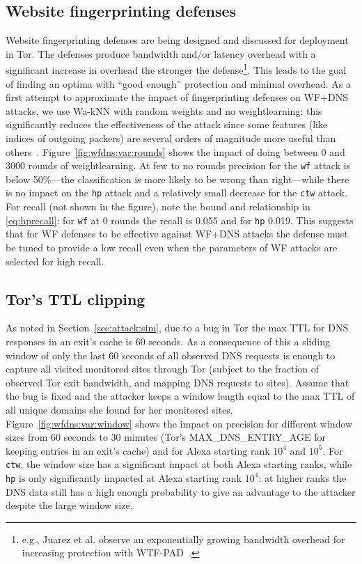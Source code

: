 \subsection{Website fingerprinting defenses}
Website fingerprinting defenses are being
designed and discussed for deployment in Tor.
The defenses produce bandwidth and/or latency overhead with a significant
increase in overhead the stronger the defense\footnote{e.g., Juarez et al.
observe an exponentially growing bandwidth overhead for increasing protection
with WTF-PAD~\cite{DBLP:journals/corr/JuarezIPDW15}.}.
This leads to the goal of finding an optima with ``good enough''
protection and minimal overhead.
As a first attempt to approximate the impact of fingerprinting
defenses on WF+DNS attacks, we use Wa-kNN with
random weights and no weightlearning: this significantly reduces the
effectiveness of the attack since some features (like indices of outgoing
packers) are several orders of magnitude more useful
than others~\cite{DBLP:journals/corr/JuarezIPDW15}.
Figure~\ref{fig:wfdns:var:rounds} shows the impact of doing between 0 and 3000
rounds of weightlearning. At few to no rounds precision for the \texttt{wf}
attack is below 50\%---the classification is more likely to be wrong than
right---while there is no impact on the \texttt{hp} attack and a relatively
small decrease for the \texttt{ctw} attack.
For recall (not shown in the figure), note the bound and relationship in
\ref{eq:hprecall}: for \texttt{wf} at 0 rounds the recall is 0.055 and for
\texttt{hp} 0.019. This suggests that for WF defenses to
be effective against WF+DNS attacks the defense must be tuned to provide a
low recall even when the parameters of WF attacks are selected for high
recall.

\subsection{Tor's TTL clipping}
As noted in Section~\ref{sec:attack:sim}, due to a bug in Tor the max TTL
for DNS responses in an exit's cache is 60 seconds. As a consequence of this
a sliding window of only the last 60 seconds of all observed DNS requests is
enough to capture all visited monitored sites through Tor (subject to the
fraction of observed Tor exit bandwidth, and mapping DNS requests to sites).
Assume that the bug is fixed and the attacker keeps a window length equal
to the max TTL of all unique domains she found for her monitored sites.
Figure~\ref{fig:wfdns:var:window} shows the impact on precision for different
window sizes from 60 seconds to 30 minutes (Tor's MAX\_DNS\_ENTRY\_AGE
for keeping entries in an exit's cache) and for Alexa starting rank $10^4$ and
$10^5$. For \texttt{ctw}, the window size has a significant impact at both
Alexa starting ranks, while \texttt{hp} is only significantly impacted at
Alexa starting rank $10^4$: at higher ranks the DNS data still has a high
enough probability to give an advantage to the attacker despite the large
window size.

